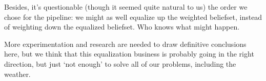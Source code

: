 \documentclass[11pt]{article}
\begin{document}
Besides, it's questionable (though it seemed quite natural to us) the order we chose for the pipeline: we might as well equalize up the weighted beliefset, instead of weighting down the equalized beliefset. Who knows what might happen.

More experimentation and research are needed to draw definitive conclusions here, but we think that this equalization business is probably going in the right direction, but just `not enough' to solve all of our problems, including the weather.
\end{document}
